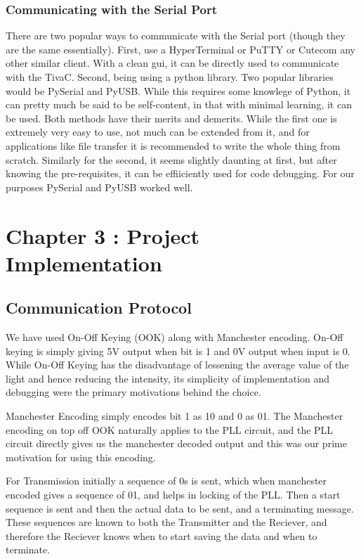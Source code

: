 \documentclass{article}
\begin{document}
\subsubsection{Communicating with the Serial Port}
There are two popular ways to communicate with the Serial port (though they are the same essentially). First, use a HyperTerminal or PuTTY or Cutecom any other similar client. With a clean gui, it can be directly used to communicate with the TivaC. Second, being using a python library. Two popular libraries would be PySerial and PyUSB. While this requires some knowlege of Python, it can pretty much be said to be self-content, in that with minimal learning, it can be used. Both methods have their merits and demerits. While the first one is extremely very easy to use, not much can be extended from it, and for applications like file transfer it is recommended to write the whole thing from scratch. Similarly for the second, it seems slightly daunting at first, but after knowing the pre-requisites, it can be effiiciently used for code debugging. For our purposes PySerial and PyUSB worked well.
\section{Chapter 3 : Project Implementation}
\subsection{Communication Protocol}
We have used On-Off Keying (OOK) along with Manchester encoding. On-Off keying is simply giving 5V output when bit is 1 and 0V output when input is 0. While On-Off Keying has the disadvantage of lessening the average value of the light and hence reducing the intensity, its simplicity of implementation and debugging were the primary motivations behind the choice.

Manchester Encoding simply encodes bit 1 as 10 and 0 as 01. The Manchester encoding on top off OOK naturally applies to the PLL circuit, and the PLL circuit directly gives us the manchester decoded output and this was our prime motivation for using this encoding.

For Transmission initially a sequence of 0s is sent, which when manchester encoded gives a sequence of 01, and helps in locking of the PLL. Then a start sequence is sent and then the actual data to be sent, and a terminating message. These sequences are known to both the Transmitter and the Reciever, and therefore the Reciever knows when to start saving the data and when to terminate. 
\end{document}
